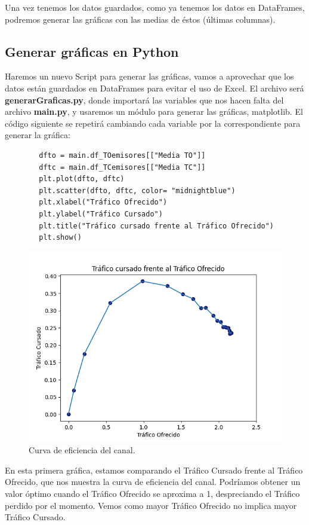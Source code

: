 \documentclass{article}
\begin{document}
Una vez tenemos los datos guardados, como ya tenemos los datos en DataFrames, podremos generar las gráficas con las medias de éstos (últimas columnas).

\subsection{Generar gráficas en Python}

Haremos un nuevo Script para generar las gráficas, vamos a aprovechar que los datos están guardados en DataFrames para evitar el uso de Excel. El archivo será \textbf{generarGraficas.py}, donde importará las variables que nos hacen falta del archivo \textbf{main.py}, y usaremos un módulo para generar las gráficas, matplotlib. El código siguiente se repetirá cambiando cada variable por la correspondiente para generar la gráfica:

\quad 
\begin{center} 
    \begin{verbatim}
        dfto = main.df_TOemisores[["Media TO"]]
        dftc = main.df_TCemisores[["Media TC"]]
        plt.plot(dfto, dftc)
        plt.scatter(dfto, dftc, color= "midnightblue")
        plt.xlabel("Tráfico Ofrecido")
        plt.ylabel("Tráfico Cursado")
        plt.title("Tráfico cursado frente al Tráfico Ofrecido")
        plt.show()

    \end{verbatim}
    \end{center} 
\quad

\begin{figure}[h]
    \centering
    \includegraphics[width=0.7\linewidth]{src/TCvsTO.png}
    \caption{\label{fig:TCvsTO} Curva de eficiencia del canal.}
\end{figure}

En esta primera gráfica, estamos comparando el Tráfico Cursado frente al Tráfico Ofrecido, que nos muestra la curva de eficiencia del canal. Podríamos obtener un valor óptimo cuando el Tráfico Ofrecido se aproxima a 1, despreciando el Tráfico perdido por el momento. Vemos como mayor Tráfico Ofrecido no implica mayor Tráfico Cursado.
\end{document}
